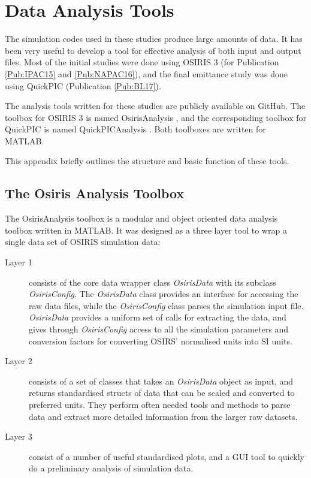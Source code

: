 %
%

\chapter{Data Analysis Tools}
\label{Apx:DA}

The simulation codes used in these studies produce large amounts of data.
It has been very useful to develop a tool for effective analysis of both input and output files.
Most of the initial studies were done using OSIRIS 3 (for Publication \ref{Pub:IPAC15} and \ref{Pub:NAPAC16}), and the final emittance study was done using QuickPIC (Publication \ref{Pub:BL17}).

The analysis tools written for these studies are publicly available on GitHub.
The toolbox for OSIRIS 3 is named OsirisAnalysis \cite{code:osiris_analysis:2013}, and the corresponding toolbox for QuickPIC is named QuickPICAnalysis \cite{code:quickpic_analysis:2017}.
Both toolboxes are written for MATLAB.

This appendix briefly outlines the structure and basic function of these tools.


\section{The Osiris Analysis Toolbox}
\label{Tools:OA}

The OsirisAnalysis toolbox is a modular and object oriented data analysis toolbox written in MATLAB.
It was designed as a three layer tool to wrap a single data set of OSIRIS simulation data:

\begin{description}
    \item[Layer 1] consists of the core data wrapper class \emph{OsirisData} with its subclass \emph{OsirisConfig}.
        The \emph{OsirisData} class provides an interface for accessing the raw data files, while the \emph{OsirisConfig} class parses the simulation input file.
        \emph{OsirisData} provides a uniform set of calls for extracting the data, and gives through \emph{OsirisConfig} access to all the simulation parameters and conversion factors for converting OSIRS' normalised units into SI units.
    \item[Layer 2] consists of a set of classes that takes an \emph{OsirisData} object as input, and returns standardised structs of data that can be scaled and converted to preferred units.
    They perform often needed tools and methods to parse data and extract more detailed information from the larger raw datasets.
    \item[Layer 3] consist of a number of useful standardised plots, and a GUI tool to quickly do a preliminary analysis of simulation data.
\end{description}

